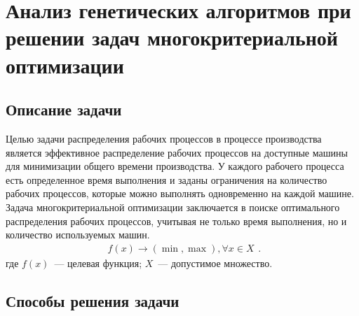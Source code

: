 \chapter{Анализ генетических алгоритмов при решении задач многокритериальной оптимизации}

\section{Описание задачи}
Целью задачи распределения рабочих процессов в процессе производства является эффективное распределение рабочих процессов на доступные машины для минимизации общего времени производства. 
У каждого рабочего процесса есть определенное время выполнения и заданы ограничения на количество рабочих процессов, которые можно выполнять одновременно на каждой машине.
Задача многокритериальной оптимизации заключается в поиске оптимального распределения рабочих процессов, учитывая не только время выполнения, но и количество используемых машин.
\begin{equation}
	\begin{gathered}
		f(x) \to (\min, \max), \forall x \in X
	\end{gathered}.
\end{equation}
где $f(x)$~--- целевая функция;
$X$~--- допустимое множество.


\section{Способы решения задачи}

